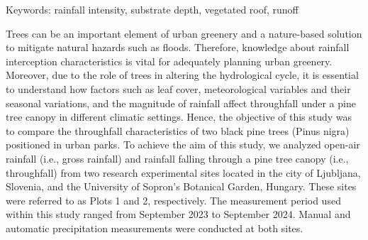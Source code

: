Keywords: rainfall intensity, substrate depth, vegetated roof, runoff
\newpage{}
{}
\begin{flushleft}






\end{flushleft}

\noindent

Trees can be an important element of urban greenery and a nature-based solution to mitigate natural
hazards such as floods. Therefore, knowledge about rainfall interception characteristics is vital for
adequately planning urban greenery. Moreover, due to the role of trees in altering the hydrological
cycle, it is essential to understand how factors such as leaf cover, meteorological variables and their
seasonal variations, and the magnitude of rainfall affect throughfall under a pine tree canopy in
different climatic settings. Hence, the objective of this study was to compare the throughfall
characteristics of two black pine trees (Pinus nigra) positioned in urban parks. To achieve the aim of
this study, we analyzed open-air rainfall (i.e., gross rainfall) and rainfall falling through a pine tree
canopy (i.e., throughfall) from two research experimental sites located in the city of Ljubljana,
Slovenia, and the University of Sopron’s Botanical Garden, Hungary. These sites were referred to as
Plots 1 and 2, respectively. The measurement period used within this study ranged from September
2023 to September 2024. Manual and automatic precipitation measurements were conducted at both
sites.

